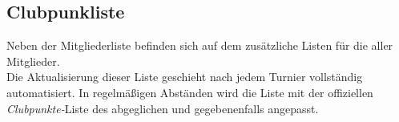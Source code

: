 \subsection{Clubpunkliste}

\noindent
Neben der Mitgliederliste befinden sich auf dem \bb \ser zusätzliche Listen für
die \cps aller Mitglieder.\\[.1cm]

\noindent
Die Aktualisierung dieser Liste geschieht nach jedem Turnier vollständig automatisiert.
In regelmäßigen Abständen wird die Liste mit der offiziellen \textit{Clubpunkte-}Liste
des \dbvs abgeglichen und gegebenenfalls angepasst.
